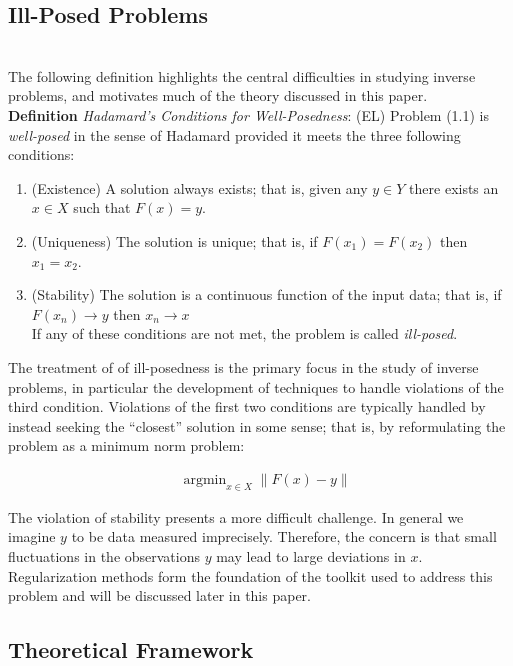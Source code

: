 \documentclass[12pt]{amsart}
\newcommand*{\norm}[1]{\left\lVert#1\right\rVert}
\DeclareMathOperator*{\argmin}{argmin}
\begin{document}
\subsection{Ill-Posed Problems} \hfill \\
The following definition highlights the central difficulties in studying inverse problems, and motivates much of the theory discussed in this paper. \\


\textbf{Definition} \textit{Hadamard's Conditions for Well-Posedness}: (EL) Problem (1.1) is \textit{well-posed} in the sense of Hadamard provided it meets the three following conditions: 
\begin{enumerate} 
\item (Existence) A solution always exists; that is, given any $y \in Y$ there exists an $x \in X$ such that $F(x) = y$. 
\item (Uniqueness) The solution is unique; that is, if $F(x_1) = F(x_2)$ then $x_1 = x_2$.
\item (Stability) The solution is a continuous function of the input data; that is, if $F(x_n) \to y$  then $x_n \to x$ \\
If any of these conditions are not met, the problem is called \textit{ill-posed}. 
\end{enumerate} 

The treatment of of ill-posedness is the primary focus in the study of inverse problems, in particular the development of techniques to handle violations of the third condition. Violations of the first two conditions are typically handled by instead seeking the ``closest'' solution in some sense; that is, by reformulating the problem as a minimum norm problem: 

\begin{align*}
&\argmin_{x \in X} \norm{F(x) - y}
\end{align*}
 
 The violation of stability presents a more difficult challenge. In general we imagine $y$ to be data measured imprecisely. Therefore, the concern is that small fluctuations in the observations $y$ may lead to large deviations in $x$. Regularization methods form the foundation of the toolkit used to address this problem and will be discussed later in this paper. 
 
 \subsection{Theoretical Framework} \hfill \\
 
\end{document}
